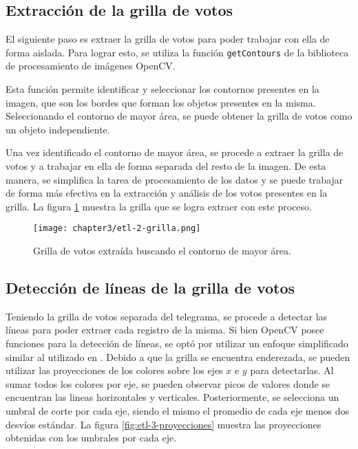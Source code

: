 \subsection{Extracción de la grilla de votos}
El siguiente paso es extraer la grilla de votos para poder trabajar con ella de forma aislada. Para lograr esto, se
utiliza la función \verb|getContours| de la biblioteca de procesamiento de imágenes OpenCV.

Esta función permite identificar y seleccionar los contornos presentes en la imagen, que son los bordes que forman los
objetos presentes en la misma. Seleccionando el contorno de mayor área, se puede obtener la grilla de votos como un
objeto independiente.

Una vez identificado el contorno de mayor área, se procede a extraer la grilla de votos y a trabajar en ella de forma
separada del resto de la imagen. De esta manera, se simplifica la tarea de procesamiento de los datos y se puede
trabajar de forma más efectiva en la extracción y análisis de los votos presentes en la grilla. La figura
\ref{fig:etl-2-grilla} muestra la grilla que se logra extraer con este proceso.

\begin{figure}[H]
    \centering
    \texttt{[image: chapter3/etl-2-grilla.png]}
    \caption[Grilla de votos detectada]{Grilla de votos extraída buscando el contorno de mayor área.}
    \label{fig:etl-2-grilla}
\end{figure}

\subsection{Detección de líneas de la grilla de votos}
Teniendo la grilla de votos separada del telegrama, se procede a detectar las líneas para poder extraer cada registro
de la misma. Si bien OpenCV posee funciones para la detección de líneas, se optó por utilizar un enfoque simplificado
similar al utilizado en \parencite{lamagna2016lectura}. Debido a que la grilla se encuentra enderezada, se pueden utilizar las proyecciones de los
colores sobre los ejes $x$ e $y$ para detectarlas. Al sumar todos los colores por eje, se pueden observar picos de
valores donde se encuentran las lineas horizontales y verticales. Posteriormente, se selecciona un umbral de corte por
cada eje, siendo el mismo el promedio de cada eje menos dos desvíos estándar. La figura \ref{fig:etl-3-proyecciones}
muestra las proyecciones obtenidas con los umbrales por cada eje.

